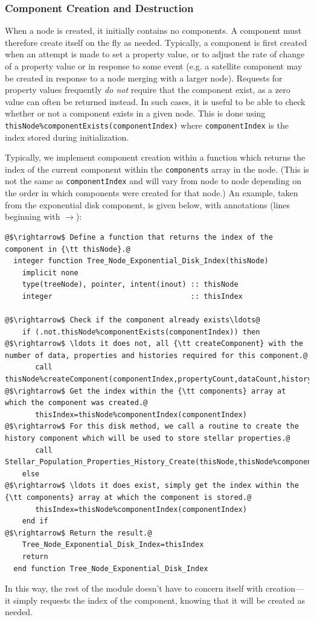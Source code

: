 \subsubsection{Component Creation and Destruction}

When a node is created, it initially contains no components. A component must therefore create itself on the fly as needed. Typically, a component is first created when an attempt is made to set a property value, or to adjust the rate of change of a property value or in response to some event (e.g. a satellite component may be created in response to a node merging with a larger node). Requests for property values frequently \emph{do not} require that the component exist, as a zero value can often be returned instead. In such cases, it is useful to be able to check whether or not a component exists in a given node. This is done using {\tt thisNode\%componentExists(componentIndex)} where {\tt componentIndex} is the index stored during initialization.

Typically, we implement component creation within a function which returns the index of the current component within the {\tt components} array in the node. (This is not the same as {\tt componentIndex} and will vary from node to node depending on the order in which components were created for that node.) An example, taken from the exponential disk component, is given below, with annotations (lines beginning with $\rightarrow$):
\begin{lstlisting}[escapechar=@,breaklines,prebreak=\&,postbreak=\&]
@$\rightarrow$ Define a function that returns the index of the component in {\tt thisNode}.@
  integer function Tree_Node_Exponential_Disk_Index(thisNode)
    implicit none
    type(treeNode), pointer, intent(inout) :: thisNode
    integer                                :: thisIndex
    
@$\rightarrow$ Check if the component already exists\ldots@
    if (.not.thisNode%componentExists(componentIndex)) then
@$\rightarrow$ \ldots it does not, all {\tt createComponent} with the number of data, properties and histories required for this component.@
       call thisNode%createComponent(componentIndex,propertyCount,dataCount,historyCount)
@$\rightarrow$ Get the index within the {\tt components} array at which the component was created.@
       thisIndex=thisNode%componentIndex(componentIndex)
@$\rightarrow$ For this disk method, we call a routine to create the history component which will be used to store stellar properties.@
       call Stellar_Population_Properties_History_Create(thisNode,thisNode%components(thisIndex)%histories(stellarHistoryIndex))
    else
@$\rightarrow$ \ldots it does exist, simply get the index within the {\tt components} array at which the component is stored.@
       thisIndex=thisNode%componentIndex(componentIndex)
    end if
@$\rightarrow$ Return the result.@
    Tree_Node_Exponential_Disk_Index=thisIndex
    return
  end function Tree_Node_Exponential_Disk_Index
\end{lstlisting}
In this way, the rest of the module doesn't have to concern itself with creation---it simply requests the index of the component, knowing that it will be created as needed.

